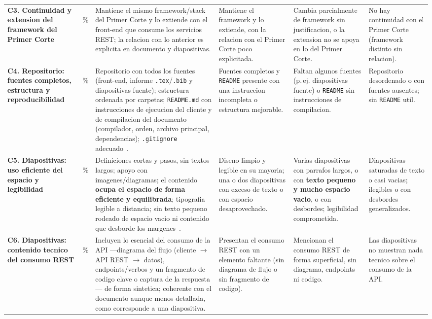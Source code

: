 \documentclass[11pt,a4paper]{article}
\begin{document}
{\begin{longtable}{|L{2.9cm}|C{0.8cm}|L{2.6cm}|L{2.6cm}|L{2.6cm}|L{2.3cm}|}
\textbf{C3. Continuidad y extension del framework del Primer Corte} &
\,\% &
Mantiene el mismo framework/stack del Primer Corte y lo extiende con el front-end que consume los servicios REST; la relacion con lo anterior es explicita en documento y diapositivas. &
Mantiene el framework y lo extiende, con la relacion con el Primer Corte poco explicitada. &
Cambia parcialmente de framework sin justificacion, o la extension no se apoya en lo del Primer Corte. &
No hay continuidad con el Primer Corte (framework distinto sin relacion). \\

\textbf{C4. Repositorio: fuentes completos, estructura y reproducibilidad} &
\,\% &
Repositorio con todos los fuentes (front-end, informe \texttt{.tex}/\texttt{.bib} y diapositivas fuente); estructura ordenada por carpetas; \texttt{README.md} con instrucciones de ejecucion del cliente y de compilacion del documento (compilador, orden, archivo principal, dependencias); \texttt{.gitignore} adecuado~\cite{washizaki2024swebok}. &
Fuentes completos y \texttt{README} presente con una instruccion incompleta o estructura mejorable. &
Faltan algunos fuentes (p.\,ej. diapositivas fuente) o \texttt{README} sin instrucciones de compilacion. &
Repositorio desordenado o con fuentes ausentes; sin \texttt{README} util. \\

\textbf{C5. Diapositivas: uso eficiente del espacio y legibilidad} &
\,\% &
Definiciones cortas y pasos, sin textos largos; apoyo con imagenes/diagramas; el contenido \textbf{ocupa el espacio de forma eficiente y equilibrada}; tipografia legible a distancia; sin texto pequeno rodeado de espacio vacio ni contenido que desborde los margenes~\cite{alley2013craft,mayer2009multimedia}. &
Diseno limpio y legible en su mayoria; una o dos diapositivas con exceso de texto o con espacio desaprovechado. &
Varias diapositivas con parrafos largos, o con \textbf{texto pequeno y mucho espacio vacio}, o con desbordes; legibilidad comprometida. &
Diapositivas saturadas de texto o casi vacias; ilegibles o con desbordes generalizados. \\

\textbf{C6. Diapositivas: contenido tecnico del consumo REST} &
\,\% &
Incluyen lo esencial del consumo de la API ---diagrama del flujo (cliente $\to$ API REST $\to$ datos), endpoints/verbos y un fragmento de codigo clave o captura de la respuesta--- de forma sintetica; coherente con el documento aunque menos detallada, como corresponde a una diapositiva. &
Presentan el consumo REST con un elemento faltante (sin diagrama de flujo o sin fragmento de codigo). &
Mencionan el consumo REST de forma superficial, sin diagrama, endpoints ni codigo. &
Las diapositivas no muestran nada tecnico sobre el consumo de la API. \\


\end{longtable}}
\end{document}
